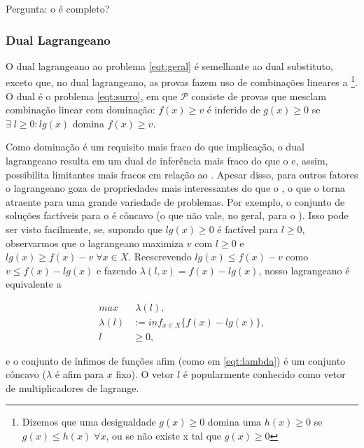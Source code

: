 \documentclass{article}
\begin{document}
Pergunta: o  é completo?

\subsubsection{Dual Lagrangeano}

O dual lagrangeano ao problema \ref{eqt:geral} é semelhante ao dual substituto, exceto que, no dual
lagrangeano, as provas fazem uso de combinações lineares a \footnote{Dizemos que uma
desigualdade $g(x) \geq 0$ domina uma $h(x) \geq 0$ se $g(x) \leq h(x) \;\forall x$, ou se não existe x
tal que $g(x) \geq 0$}. O dual é o problema \ref{eqt:surro}, em que $\mathcal{P}$ consiste de provas
que mesclam combinação linear com dominação: $f(x) \geq v$ é inferido de $g(x) \geq 0$ se $\exists
\; l \geq 0: lg(x)$ domina $f(x) \geq v$.

Como dominação é um requisito mais fraco do que implicação, o dual lagrangeano resulta em um dual de
inferência mais fraco do que o  e, assim, possibilita limitantes mais fracos
em relação ao . Apesar disso, para outros fatores o lagrangeano goza de propriedades mais
interessantes do que o , o que o torna atraente para uma grande variedade de problemas. Por exemplo,
o conjunto de soluções factíveis para o  é côncavo (o que não vale, no
geral, para o ). Isso pode ser visto
facilmente, se, supondo que $lg(x) \geq 0$ é factível para $l\geq0$, observarmos que o
lagrangeano maximiza $v$ com $l \geq 0$ e $lg(x) \geq f(x) - v \; \forall x \in X$. Reescrevendo $lg(x)
\leq f(x) - v$ como $v \leq f(x) - lg(x)$ e fazendo $\lambda(l,x) = f(x) - lg(x)$, nosso
lagrangeano é equivalente a

  \begin{align}
     max &\; \lambda(l),\\
     \lambda(l) &:=  inf_{x \in X}\{f(x) - lg(x)\},\label{eqt:lambda}\\
     l & \geq 0,
  \end{align}

\noindent e o conjunto de ínfimos de funções afim (como em \ref{eqt:lambda}) é um conjunto côncavo
($\lambda$ é afim para $x$ fixo). O vetor $l$ é popularmente conhecido como vetor de multiplicadores
de lagrange.
\end{document}
